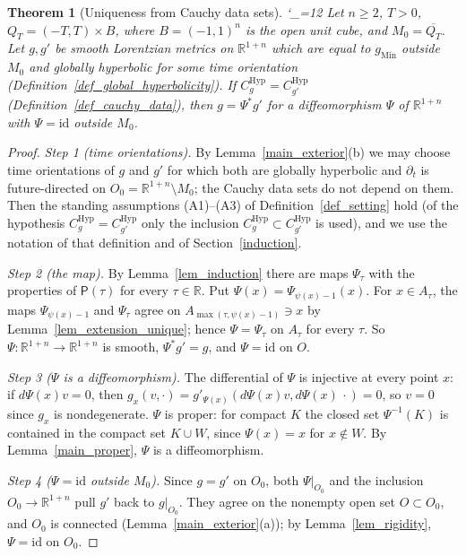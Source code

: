 \documentclass[11pt,a4paper,reqno]{amsart}
\newtheorem{theorem}{Theorem}[section]
\theoremstyle{definition}
\numberwithin{equation}{section}
\newcommand{\R}{\mathbb{R}}
\newcommand{\sP}{\mathsf{P}}
\newcommand{\gM}{g_{\mathrm{Min}}}
\newcommand{\id}{\mathrm{id}}
\newcommand{\lean}{\begingroup\catcode`\_=12\relax\leanaux}
\newcommand{\leanaux}[1]{{\footnotesize\raggedright Lean: \texttt{#1}\par}\endgroup}
\begin{document}
\begin{theorem}[Uniqueness from Cauchy data sets]\label{thm_main}
\lean{LorentzianCalderon.main}
Let $n\ge2$, $T>0$, $Q_T=(-T,T)\times B$, where $B=(-1,1)^n$ is the open unit cube, and $M_0=\overline{Q_T}$. Let
$g,g'$ be smooth Lorentzian metrics on $\R^{1+n}$ which are equal to $\gM$ outside $M_0$ and globally hyperbolic for some
time orientation (Definition~\ref{def_global_hyperbolicity}). If $C^{\mathrm{Hyp}}_g=C^{\mathrm{Hyp}}_{g'}$
(Definition~\ref{def_cauchy_data}), then $g=\Psi^*g'$ for a diffeomorphism $\Psi$ of $\R^{1+n}$ with $\Psi=\id$ outside
$M_0$.
\end{theorem}
\begin{proof}
\emph{Step 1 (time orientations).} By Lemma~\ref{main_exterior}(b) we may choose time orientations of $g$ and $g'$ for which
both are globally hyperbolic and $\partial_t$ is future-directed on $O_0=\R^{1+n}\setminus M_0$; the Cauchy data sets do not
depend on them. Then the standing assumptions \textup{(A1)}--\textup{(A3)} of Definition~\ref{def_setting} hold (of the
hypothesis $C^{\mathrm{Hyp}}_g=C^{\mathrm{Hyp}}_{g'}$ only the inclusion $C^{\mathrm{Hyp}}_g\subset C^{\mathrm{Hyp}}_{g'}$
is used), and we use the notation of that definition and of Section~\ref{induction}.

\emph{Step 2 (the map).} By Lemma~\ref{lem_induction} there are maps $\Psi_\tau$ with the properties of $\sP(\tau)$ for
every $\tau\in\R$. Put $\Psi(x)=\Psi_{\psi(x)-1}(x)$. For $x\in A_\tau$, the maps $\Psi_{\psi(x)-1}$ and $\Psi_\tau$ agree
on $A_{\max(\tau,\psi(x)-1)}\ni x$ by Lemma~\ref{lem_extension_unique}; hence $\Psi=\Psi_\tau$ on $A_\tau$ for every $\tau$.
So $\Psi\colon\R^{1+n}\to\R^{1+n}$ is smooth, $\Psi^*g'=g$, and $\Psi=\id$ on $O$.

\emph{Step 3 ($\Psi$ is a diffeomorphism).} The differential of $\Psi$ is injective at every point $x$: if $d\Psi(x)v=0$, then
$g_x(v,\cdot)=g'_{\Psi(x)}(d\Psi(x)v,d\Psi(x)\,\cdot)=0$, so $v=0$ since $g_x$ is nondegenerate. $\Psi$ is proper: for
compact $K$ the closed set $\Psi^{-1}(K)$ is contained in the compact set $K\cup W$, since $\Psi(x)=x$ for $x\notin W$. By
Lemma~\ref{main_proper}, $\Psi$ is a diffeomorphism.

\emph{Step 4 ($\Psi=\id$ outside $M_0$).} Since $g=g'$ on $O_0$, both $\Psi|_{O_0}$ and the inclusion
$O_0\to\R^{1+n}$ pull $g'$ back to $g|_{O_0}$. They agree on the nonempty open set $O\subset O_0$, and $O_0$ is connected
(Lemma~\ref{main_exterior}(a)); by Lemma~\ref{lem_rigidity}, $\Psi=\id$ on $O_0$.
\end{proof}
\end{document}
